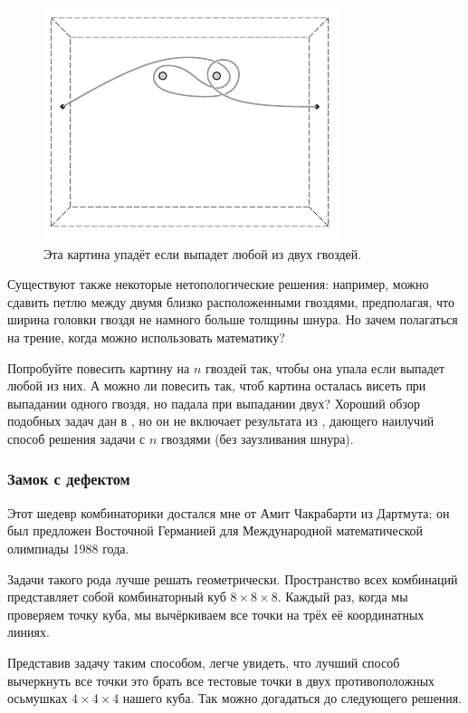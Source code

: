 \begin{figure}[h!]
\centering
\includegraphics[scale=1]{pics/kartina2}
\caption{Эта картина упадёт если выпадет любой из двух гвоздей.}
\label{pic:kartina2}
\end{figure}

Существуют также некоторые нетопологические решения: например, можно сдавить петлю между двумя близко расположенными гвоздями, предполагая, что ширина головки гвоздя не намного больше толщины шнура.
Но зачем полагаться на трение, когда можно использовать математику?

\begin{addedbytheeditors}
Попробуйте повесить картину на $n$ гвоздей так, чтобы она упала если выпадет любой из них.
А можно ли повесить так, чтоб картина осталась висеть при выпадании одного гвоздя, но падала при выпадании двух?
Хороший обзор подобных задач дан в \cite{demaine2014}, но он не включает результата из \cite{gartside-greenwood}, дающего наилучий способ решения задачи с $n$ гвоздями (без заузливания шнура).\pr
\end{addedbytheeditors}

\subsubsection*{Замок с дефектом}

Этот шедевр комбинаторики достался мне от Амит Чакрабарти из Дартмута;
он был предложен Восточной Германией для Международной математической олимпиады 1988 года.

Задачи такого рода лучше решать геометрически.
Пространство всех комбинаций представляет собой комбинаторный куб $8 \times 8 \times 8$.
Каждый раз, когда мы проверяем точку куба, мы вычёркиваем все точки на трёх её координатных линиях.

Представив задачу таким способом, легче увидеть, что лучший способ вычеркнуть все точки это брать все тестовые точки в двух противоположных осьмушках $4 \times 4 \times 4$ нашего куба.
Так можно догадаться до следующего решения.

